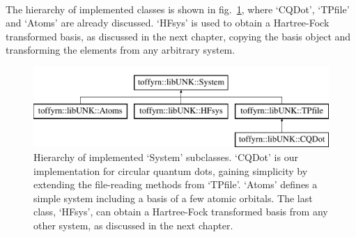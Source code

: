 \paragraph{}
The hierarchy of implemented classes is shown in fig.~\ref{fig:qDots:classTree}, where `CQDot', `TPfile' and `Atoms' are already discussed.
`HFsys' is used to obtain a Hartree-Fock transformed basis, as discussed in the next chapter, copying the basis object and transforming the elements from any arbitrary system.
\begin{figure}
\begin{center}
\includegraphics[scale=0.8]{../07-qDots/figs/classTree.pdf}
\caption{Hierarchy of implemented `System' subclasses. `CQDot' is our implementation for circular quantum dots, gaining simplicity by extending the file-reading methods from `TPfile'. `Atoms' defines a simple system including a basis of a few atomic orbitals. The last class, `HFsys', can obtain a Hartree-Fock transformed basis from any other system, as discussed in the next chapter.}
\label{fig:qDots:classTree}
\end{center}
\end{figure}





